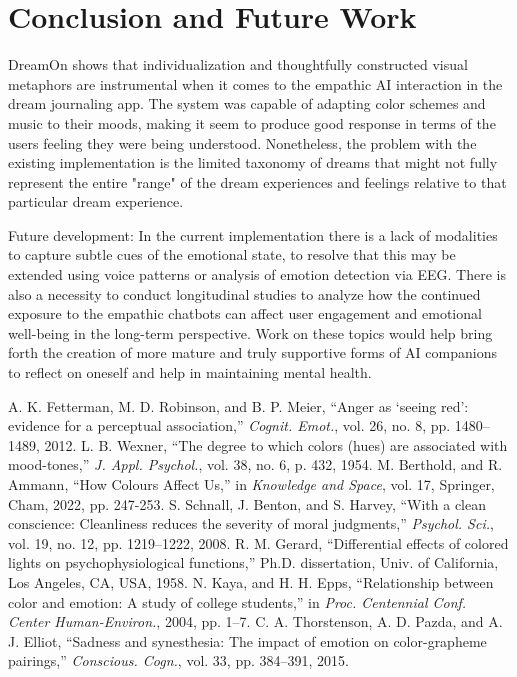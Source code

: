 \documentclass[conference]{IEEEtran}
\begin{document}
\section{Conclusion and Future Work}
DreamOn shows that individualization and thoughtfully constructed visual metaphors are instrumental when it comes to the empathic AI interaction in the dream journaling app. The system was capable of adapting color schemes and music to their moods, making it seem to produce good response in terms of the users feeling they were being understood. Nonetheless, the problem with the existing implementation is the limited taxonomy of dreams that might not fully represent the entire "range" of the dream experiences and feelings relative to that particular dream experience.

Future development: In the current implementation there is a lack of modalities to capture subtle cues of the emotional state, to resolve that this may be extended using voice patterns or analysis of emotion detection via EEG. There is also a necessity to conduct longitudinal studies to analyze how the continued exposure to the empathic chatbots can affect user engagement and emotional well-being in the long-term perspective. Work on these topics would help bring forth the creation of more mature and truly supportive forms of AI companions to reflect on oneself and help in maintaining mental health.
	
	
	\begin{thebibliography}{00}
		 A. K. Fetterman, M. D. Robinson, and B. P. Meier, ``Anger as `seeing red': evidence for a perceptual association,'' \textit{Cognit. Emot.}, vol. 26, no. 8, pp. 1480--1489, 2012.
		 L. B. Wexner, ``The degree to which colors (hues) are associated with mood-tones,'' \textit{J. Appl. Psychol.}, vol. 38, no. 6, p. 432, 1954.
		 M. Berthold, and R. Ammann, ``How Colours Affect Us,'' in \textit{Knowledge and Space}, vol. 17, Springer, Cham, 2022, pp. 247-253.
		 S. Schnall, J. Benton, and S. Harvey, ``With a clean conscience: Cleanliness reduces the severity of moral judgments,'' \textit{Psychol. Sci.}, vol. 19, no. 12, pp. 1219--1222, 2008.
		 R. M. Gerard, ``Differential effects of colored lights on psychophysiological functions,'' Ph.D. dissertation, Univ. of California, Los Angeles, CA, USA, 1958.
		 N. Kaya, and H. H. Epps, ``Relationship between color and emotion: A study of college students,'' in \textit{Proc. Centennial Conf. Center Human-Environ.}, 2004, pp. 1--7.
		 C. A. Thorstenson, A. D. Pazda, and A. J. Elliot, ``Sadness and synesthesia: The impact of emotion on color-grapheme pairings,'' \textit{Conscious. Cogn.}, vol. 33, pp. 384--391, 2015.
	\end{thebibliography}
	
\end{document}
